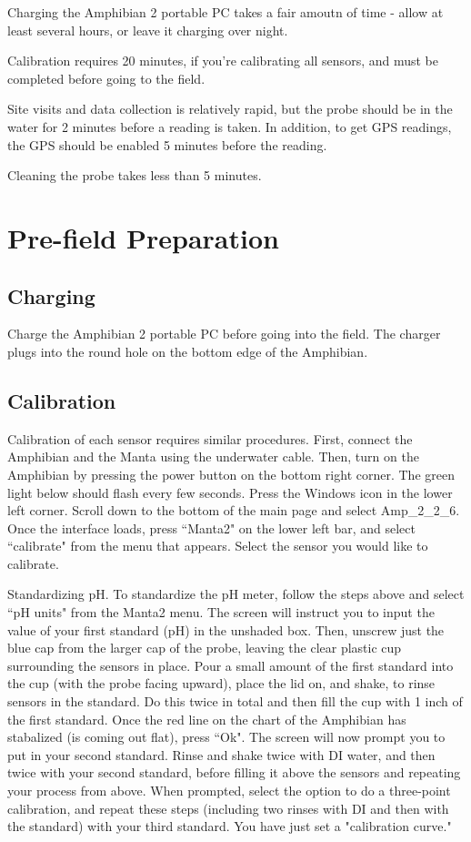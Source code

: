 \documentclass[12pt]{../SOP3_beta}\usepackage[]{graphicx}\usepackage[]{color}
\begin{document}
\NP Charging the Amphibian 2 portable PC takes a fair amoutn of time - allow at least several hours, or leave it charging over night. 

\NP Calibration requires 20 minutes, if you're calibrating all sensors, and must be completed before going to the field.

\NP Site visits and data collection is relatively rapid, but the probe should be in the water for 2 minutes before a reading is taken. In addition, to get GPS readings, the GPS should be enabled 5 minutes before the reading.

\NP Cleaning the probe takes less than 5 minutes.

\section{Pre-field Preparation}

\subsection{Charging}

\NP Charge the Amphibian 2 portable PC before going into the field. The charger plugs into the round hole on the bottom edge of the Amphibian. 

\subsection{Calibration}

\NP Calibration of each sensor requires similar procedures. First, connect the Amphibian and the Manta using the underwater cable. Then, turn on the Amphibian by pressing the power button on the bottom right corner. The green light below should flash every few seconds. Press the Windows icon in the lower left corner. Scroll down to the bottom of the main page and select Amp\_2\_2\_6. Once the interface loads, press ``Manta2" on the lower left bar, and select ``calibrate" from the menu that appears. Select the sensor you would like to calibrate. 

\NP Standardizing pH. To standardize the pH meter, follow the steps above and select ``pH units" from the Manta2 menu. The screen will instruct you to input the value of your first standard (pH) in the unshaded box. Then, unscrew just the blue cap from the larger cap of the probe, leaving the clear plastic cup surrounding the sensors in place. Pour a small amount of the first standard into the cup (with the probe facing upward), place the lid on, and shake, to rinse sensors in the standard. Do this twice in total and then fill the cup with 1 inch of the first standard. Once the red line on the chart of the Amphibian has stabalized (is coming out flat), press ``Ok". The screen will now prompt you to put in your second standard. Rinse and shake twice with DI water, and then twice with your second standard, before filling it above the sensors and repeating your process from above. When prompted, select the option to do a three-point calibration, and repeat these steps (including two rinses with DI and then with the standard) with your third standard. You have just set a "calibration curve."
\end{document}

